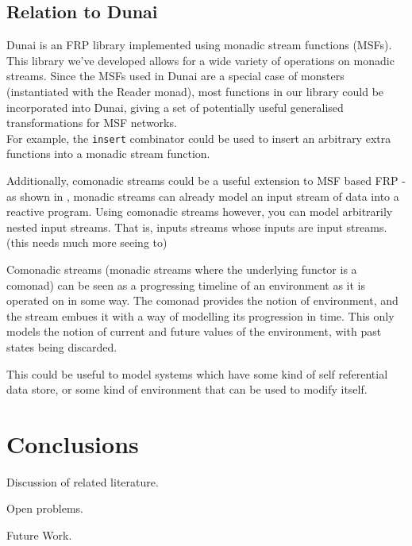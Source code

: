 \documentclass{article}
\begin{document}

\subsection{Relation to Dunai}

Dunai \cite{frp_refactored} is an FRP library implemented using monadic stream functions (MSFs). \\

This library we've developed allows for a wide variety of operations on monadic streams. Since the MSFs used in Dunai are a special case of monsters (instantiated with the Reader monad), most functions in our library could be incorporated into Dunai, giving a set of potentially useful generalised transformations for MSF networks. \\

For example, the \verb+insert+ combinator could be used to insert an arbitrary extra functions into a monadic stream function.

Additionally, comonadic streams could be a useful extension to MSF based FRP - as shown in \cite{frp_refactored}, monadic streams can already model an input stream of data into a reactive program. Using comonadic streams however, you can model arbitrarily nested input streams. That is, inputs streams whose inputs are input streams. (this needs much more seeing to)

Comonadic streams (monadic streams where the underlying functor is a comonad) can be seen as a progressing timeline of an environment as it is operated on in some way. The comonad provides the notion of environment, and the stream embues it with a way of modelling its progression in time. This only models the notion of current and future values of the environment, with past states being discarded.

This could be useful to model systems which have some kind of self referential data store, or some kind of environment that can be used to modify itself.

\section{Conclusions}

Discussion of related literature.

Open problems.

Future Work.


\end{document}
